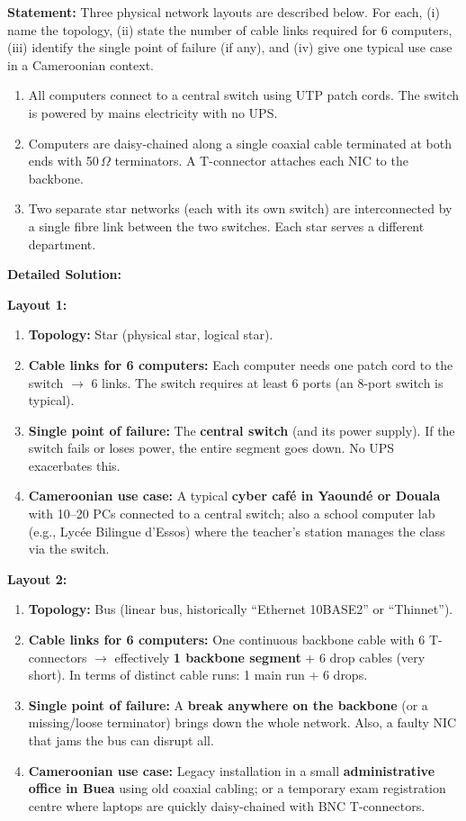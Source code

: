 \documentclass[11pt]{article}
\newcommand{\cle}[1]{{\popxbold\color{popdark}#1}}
\begin{document}
\begin{exoresolu}
\textbf{Statement:} 
Three physical network layouts are described below. For each, (i) name the topology, (ii) state the number of cable links required for 6 computers, (iii) identify the single point of failure (if any), and (iv) give one typical use case in a Cameroonian context.

\begin{enumerate}
\item All computers connect to a central switch using UTP patch cords. The switch is powered by mains electricity with no UPS.
\item Computers are daisy-chained along a single coaxial cable terminated at both ends with 50\,$\Omega$ terminators. A T-connector attaches each NIC to the backbone.
\item Two separate star networks (each with its own switch) are interconnected by a single fibre link between the two switches. Each star serves a different department.
\end{enumerate}
\tcblower
\textbf{Detailed Solution:}

\textbf{Layout 1:}
\begin{enumerate}
\item \textbf{Topology:} \cle{Star} (physical star, logical star).
\item \textbf{Cable links for 6 computers:} Each computer needs one patch cord to the switch $\rightarrow$ 6 links. The switch requires at least 6 ports (an 8-port switch is typical).
\item \textbf{Single point of failure:} The \textbf{central switch} (and its power supply). If the switch fails or loses power, the entire segment goes down. No UPS exacerbates this.
\item \textbf{Cameroonian use case:} A typical \textbf{cyber café in Yaoundé or Douala} with 10–20 PCs connected to a central switch; also a school computer lab (e.g., Lycée Bilingue d'Essos) where the teacher's station manages the class via the switch.
\end{enumerate}

\textbf{Layout 2:}
\begin{enumerate}
\item \textbf{Topology:} \cle{Bus} (linear bus, historically ``Ethernet 10BASE2'' or ``Thinnet'').
\item \textbf{Cable links for 6 computers:} One continuous backbone cable with 6 T-connectors $\rightarrow$ effectively \textbf{1 backbone segment} + 6 drop cables (very short). In terms of distinct cable runs: 1 main run + 6 drops.
\item \textbf{Single point of failure:} A \textbf{break anywhere on the backbone} (or a missing/loose terminator) brings down the whole network. Also, a faulty NIC that jams the bus can disrupt all.
\item \textbf{Cameroonian use case:} Legacy installation in a small \textbf{administrative office in Buea} using old coaxial cabling; or a temporary exam registration centre where laptops are quickly daisy-chained with BNC T-connectors.
\end{enumerate}


\end{exoresolu}
\end{document}
